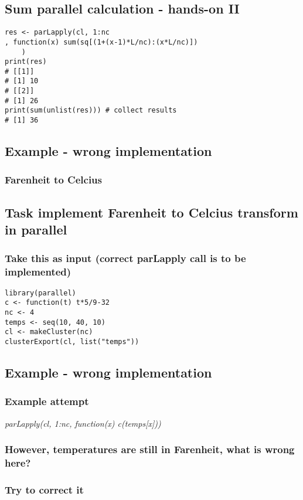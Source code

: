 \documentclass[bigger]{beamer}
\begin{document}
\subsection{Sum parallel calculation - hands-on II}
\label{sec-3-6}
\begin{verbatim}
res <- parLapply(cl, 1:nc
, function(x) sum(sq[(1+(x-1)*L/nc):(x*L/nc)])
	)
print(res)
# [[1]]
# [1] 10
# [[2]]
# [1] 26
print(sum(unlist(res))) # collect results
# [1] 36
\end{verbatim}

\subsection{Example - wrong implementation}
\label{sec-3-7}
\subsubsection{Farenheit to Celcius}
\label{sec-3-7-1}
\subsection{Task implement Farenheit to Celcius transform in parallel}
\label{sec-3-8}
\subsubsection{Take this as input (correct \textbf{parLapply} call is to be implemented)}
\label{sec-3-8-1}
\begin{verbatim}
library(parallel)
c <- function(t) t*5/9-32
nc <- 4
temps <- seq(10, 40, 10)
cl <- makeCluster(nc)
clusterExport(cl, list("temps"))
\end{verbatim}
\subsection{Example - wrong implementation}
\label{sec-3-9}
\subsubsection{Example attempt}
\label{sec-3-9-1}
\emph{parLapply(cl, 1:nc, function(x) c(temps[x]))}
\subsubsection{However, temperatures are still in Farenheit, what is wrong here?}
\label{sec-3-9-2}
\subsubsection{Try to correct it}
\label{sec-3-9-3}
\end{document}

